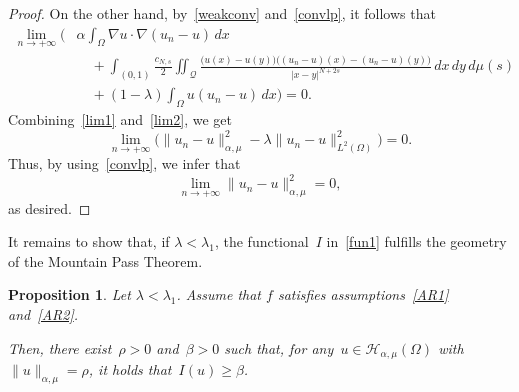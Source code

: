 \documentclass[12pt,a4paper,intlimits,sumlimits]{amsart}
\def \Q {\mathcal Q}
\theoremstyle{definition}
\theoremstyle{plain}
\newtheorem{proposition}[definition]{Proposition}
\numberwithin{equation}{section}
\renewcommand{\geq}{\geqslant}
\begin{document}
\begin{proof}
On the other hand, by~\eqref{weakconv} and~\eqref{convlp},
it follows that
\begin{equation}\label{lim2}
\begin{split}
\lim_{n\to +\infty}\Bigg(&\alpha \int_\Omega \nabla u\cdot\nabla (u_n-u) \, dx\\
&\quad+\int_{(0, 1)} \frac{c_{N, s}}{2} \iint_{\Q} \frac{\big(u(x)-u(y))((u_n-u)(x)-(u_n-u)(y)\big)}{|x-y|^{N+2s}} \,dx\,dy\, d\mu(s)\\
&\quad+(1-\lambda)\int_\Omega u(u_n-u)\, dx\Bigg)=0.
\end{split}
\end{equation}
Combining~\eqref{lim1} and~\eqref{lim2}, we get
\[
\lim_{n\to +\infty}\Big(\|u_n -u\|^2_{\alpha, \mu} -\lambda\|u_n -u\|^2_{L^2(\Omega)}\Big)=0.
\]
Thus, by using~\eqref{convlp}, we infer that
\[
\lim_{n\to +\infty}\|u_n -u\|^2_{\alpha, \mu} =0,
\]
as desired.
\end{proof}

It remains to show that, if $\lambda <\lambda_1$, the functional~$I$ in~\eqref{fun1} fulfills the geometry of the Mountain Pass Theorem.

\begin{proposition}\label{geometriaMPAR1}
Let $\lambda<\lambda_1$.
Assume that $f$ satisfies assumptions~\eqref{AR1} and~\eqref{AR2}.

Then, there exist~$\rho>0$ and~$\beta>0$ such that, for any~$u\in \mathcal{H}_{\alpha,\mu}(\Omega)$ with~$\|u\|_{\alpha,\mu}=\rho$,
it holds that~$I(u)\geq \beta$.
\end{proposition}
\end{document}
